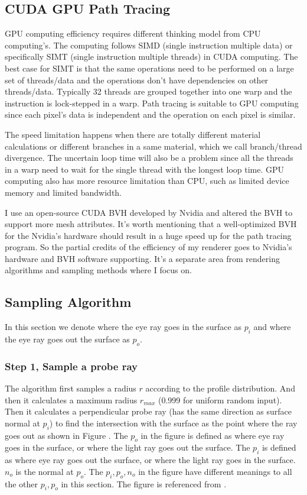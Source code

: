 \documentclass[letterpaper,12pt]{article}
\begin{document}
\subsection{CUDA GPU Path Tracing}

GPU computing efficiency requires different thinking model from CPU computing's. The computing follows SIMD (single instruction multiple data) or specifically SIMT (single instruction multiple threads) in CUDA computing. The best case for SIMT is that the same operations need to be performed on a large set of threads/data and the operations don't have dependencies on other threads/data. Typically 32 threads are grouped together into one warp and the instruction is lock-stepped in a warp\cite{han2011hicuda}. Path tracing is suitable to GPU computing since each pixel's data is independent and the operation on each pixel is similar. 

The speed limitation happens when there are totally different material calculations or different branches in a same material, which we call branch/thread divergence. The uncertain loop time will also be a problem since all the threads in a warp need to wait for the single thread with the longest loop time. GPU computing also has more resource limitation than CPU, such as limited device memory and limited bandwidth.

I use an open-source CUDA BVH\cite{aila2012understanding} developed by Nvidia and altered the BVH to support more mesh attributes. It's worth mentioning that a well-optimized BVH for the Nvidia's hardware should result in a huge speed up for the path tracing program. So the partial credits of the efficiency of my renderer goes to Nvidia's hardware and BVH software supporting. It's a separate area from rendering algorithms and sampling methods where I focus on.

\subsection{Sampling Algorithm}

In this section we denote where the eye ray goes in the surface as $p_i$ and where the eye ray goes out the surface as $p_o$.

\subsubsection{Step 1, Sample a probe ray}

The algorithm first samples a radius $r$ according to the profile distribution. And then it calculates a maximum radius $r_{max}$ (0.999 for uniform random input). Then it calculates a perpendicular probe ray (has the same direction as surface normal at $p_i$) to find the intersection with the surface as the point where the ray goes out as shown in Figure \label{fig:probe}. The $p_o$ in the figure is defined as where eye ray goes in the surface, or where the light ray goes out the surface. The $p_i$ is defined as where eye ray goes out the surface, or where the light ray goes in the surface. $n_o$ is the normal at $p_o$. The $p_i,p_o,n_o$ in the figure have different meanings to all the other $p_i, p_o$ in this section. The figure is referenced from \cite{pharr2016physically}.
\end{document}
